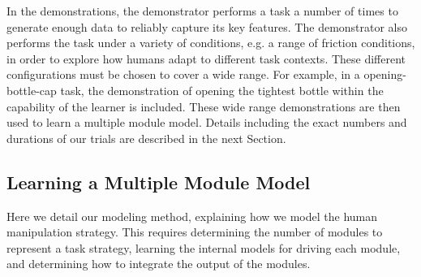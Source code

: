 
In the demonstrations, the demonstrator performs a task a number of
times to generate enough data to reliably capture its key features.
The demonstrator also performs the task under a variety of
conditions, e.g. a range of friction conditions, in order to explore
how humans adapt to different task contexts. These different
configurations must be chosen to cover a wide range.%
For example, in a opening-bottle-cap task, the demonstration of opening
the tightest bottle within the capability of the learner is
included. These wide range demonstrations are then used to learn a
multiple module model. Details including the exact numbers and
durations of our trials are described in the next
Section. %



\subsection{Learning a Multiple Module Model}
\label{sec:learn}
Here we detail our modeling method, explaining how we model the human
manipulation strategy.  This requires determining the number of modules to
represent a task strategy, learning the internal models for driving each
module, and determining how to integrate the output of the modules.

